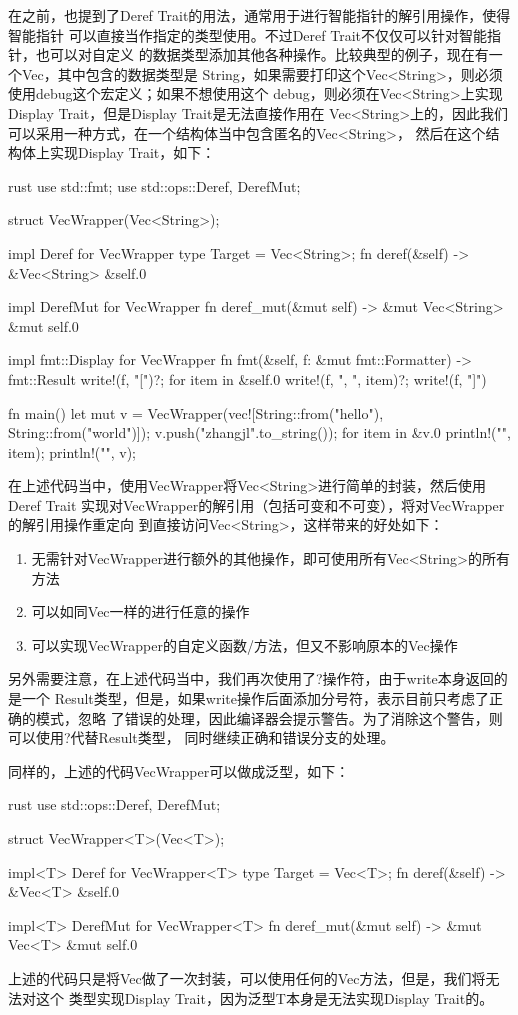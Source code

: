 在之前，也提到了Deref Trait的用法，通常用于进行智能指针的解引用操作，使得智能指针
可以直接当作指定的类型使用。不过Deref Trait不仅仅可以针对智能指针，也可以对自定义
的数据类型添加其他各种操作。比较典型的例子，现在有一个Vec，其中包含的数据类型是
String，如果需要打印这个Vec<String>，则必须使用debug这个宏定义；如果不想使用这个
debug，则必须在Vec<String>上实现Display Trait，但是Display Trait是无法直接作用在
Vec<String>上的，因此我们可以采用一种方式，在一个结构体当中包含匿名的Vec<String>，
然后在这个结构体上实现Display Trait，如下：
\begin{code-block}{rust}
use std::fmt;
use std::ops::{Deref, DerefMut};

struct VecWrapper(Vec<String>);

impl Deref for VecWrapper {
    type Target = Vec<String>;
    fn deref(&self) -> &Vec<String> {
        &self.0
    }
}

impl DerefMut for VecWrapper {
    fn deref_mut(&mut self) -> &mut Vec<String> {
        &mut self.0
    }
}

impl fmt::Display for VecWrapper {
    fn fmt(&self, f: &mut fmt::Formatter) -> fmt::Result {
        write!(f, "[")?;
        for item in &self.0 {
            write!(f, "{}, ", item)?;
        }
        write!(f, "]")
    }
}

fn main() {
    let mut v = VecWrapper(vec![String::from("hello"), String::from("world")]);
    v.push("zhangjl".to_string());
    for item in &v.0 {
        println!("{}", item);
    }
    println!("{}", v);
}
\end{code-block}
在上述代码当中，使用VecWrapper将Vec<String>进行简单的封装，然后使用Deref Trait
实现对VecWrapper的解引用（包括可变和不可变），将对VecWrapper的解引用操作重定向
到直接访问Vec<String>，这样带来的好处如下：
\begin{enumerate}
  \item 无需针对VecWrapper进行额外的其他操作，即可使用所有Vec<String>的所有方法
  \item 可以如同Vec一样的进行任意的操作
  \item 可以实现VecWrapper的自定义函数/方法，但又不影响原本的Vec操作
\end{enumerate}

另外需要注意，在上述代码当中，我们再次使用了?操作符，由于write本身返回的是一个
Result类型，但是，如果write操作后面添加分号符，表示目前只考虑了正确的模式，忽略
了错误的处理，因此编译器会提示警告。为了消除这个警告，则可以使用?代替Result类型，
同时继续正确和错误分支的处理。

同样的，上述的代码VecWrapper可以做成泛型，如下：
\begin{code-block}{rust}
use std::ops::{Deref, DerefMut};

struct VecWrapper<T>(Vec<T>);

impl<T> Deref for VecWrapper<T> {
    type Target = Vec<T>;
    fn deref(&self) -> &Vec<T> {
        &self.0
    }
}

impl<T> DerefMut for VecWrapper<T> {
    fn deref_mut(&mut self) -> &mut Vec<T> {
        &mut self.0
    }
}
\end{code-block}
上述的代码只是将Vec做了一次封装，可以使用任何的Vec方法，但是，我们将无法对这个
类型实现Display Trait，因为泛型T本身是无法实现Display Trait的。

